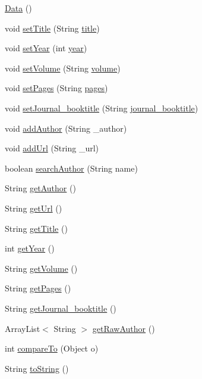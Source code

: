 \begin{DoxyCompactItemize}
\item 
\hyperlink{class_data_ac9188dcb0fca3b16e8111ce3ee5c2a1c}{Data} ()
\item 
void \hyperlink{class_data_a4efe69d1a38809de935950b0c344ac94}{set\+Title} (String \hyperlink{class_data_adcd725740eb6c1b70d03d51bcdaa4fc4}{title})
\item 
void \hyperlink{class_data_a03a832c4735f73cf7ffd55ab0261c1aa}{set\+Year} (int \hyperlink{class_data_ab4b8026b8e14d7b834aa265bf1221cae}{year})
\item 
void \hyperlink{class_data_a7112127b737cbae7671940486a3a2f2f}{set\+Volume} (String \hyperlink{class_data_aaf6320f6222ab00af52f1cd0d0c301e6}{volume})
\item 
void \hyperlink{class_data_a368b24c15d79a0ec0c33f031f489d616}{set\+Pages} (String \hyperlink{class_data_a7fa32ce168de5abce2bb00f3e1f4e23b}{pages})
\item 
void \hyperlink{class_data_a18f402932ef14e0f351e9419def6d840}{set\+Journal\+\_\+booktitle} (String \hyperlink{class_data_affdd242bc2e170a80620fb91c075ced9}{journal\+\_\+booktitle})
\item 
void \hyperlink{class_data_aee77b766926cff5acb486c8993c39607}{add\+Author} (String \+\_\+author)
\item 
void \hyperlink{class_data_a0f3fd3bbb22e15759be23fc1bf8a54b9}{add\+Url} (String \+\_\+url)
\item 
boolean \hyperlink{class_data_a457cf5a872b2a05dd0b5b14db53dceed}{search\+Author} (String name)
\item 
String \hyperlink{class_data_a4163034911e6f4b0b3e4bd2135824c5f}{get\+Author} ()
\item 
String \hyperlink{class_data_ae19e8172a648699e26eceab342383e4d}{get\+Url} ()
\item 
String \hyperlink{class_data_abed831f7e25a9173f7120dbf9bbac2bd}{get\+Title} ()
\item 
int \hyperlink{class_data_afd9f8a0a7ddf04b40ac2c6a038f61e68}{get\+Year} ()
\item 
String \hyperlink{class_data_a57d3cdf8d58ca9761c9c1873a352ad9e}{get\+Volume} ()
\item 
String \hyperlink{class_data_a7c34cb99f132d8fb526462d59a033aa8}{get\+Pages} ()
\item 
String \hyperlink{class_data_ac1e4612845513c0826716962bcad943c}{get\+Journal\+\_\+booktitle} ()
\item 
Array\+List$<$ String $>$ \hyperlink{class_data_a3e01a97f8e6695e9ae4bbdfb4e012127}{get\+Raw\+Author} ()
\item 
int \hyperlink{class_data_af0585a116e5d386a0d513b8f1549411a}{compare\+To} (Object o)
\item 
String \hyperlink{class_data_a7c190e5a2f3f11629a13a90d05e9e1cf}{to\+String} ()
\end{DoxyCompactItemize}
